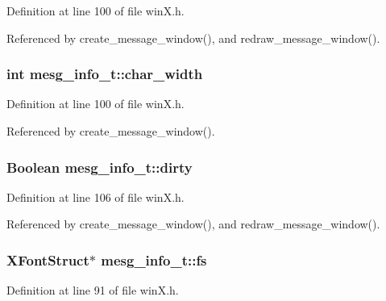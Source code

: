 Definition at line 100 of file win\+X.\+h.



Referenced by create\+\_\+message\+\_\+window(), and redraw\+\_\+message\+\_\+window().

\hypertarget{structmesg__info__t_a9d448d94905365fda9859981ae2d07a1}{
\subsubsection[{char\+\_\+width}]{\setlength{\rightskip}{0pt plus 5cm}int mesg\+\_\+info\+\_\+t\+::char\+\_\+width}}\label{structmesg__info__t_a9d448d94905365fda9859981ae2d07a1}


Definition at line 100 of file win\+X.\+h.



Referenced by create\+\_\+message\+\_\+window().

\hypertarget{structmesg__info__t_a08f16d5343387918e19cb9812303a4c7}{
\subsubsection[{dirty}]{\setlength{\rightskip}{0pt plus 5cm}Boolean mesg\+\_\+info\+\_\+t\+::dirty}}\label{structmesg__info__t_a08f16d5343387918e19cb9812303a4c7}


Definition at line 106 of file win\+X.\+h.



Referenced by create\+\_\+message\+\_\+window(), and redraw\+\_\+message\+\_\+window().

\hypertarget{structmesg__info__t_a3ac4711a90ce72d56e435d5d44167932}{
\subsubsection[{fs}]{\setlength{\rightskip}{0pt plus 5cm}X\+Font\+Struct$\ast$ mesg\+\_\+info\+\_\+t\+::fs}}\label{structmesg__info__t_a3ac4711a90ce72d56e435d5d44167932}


Definition at line 91 of file win\+X.\+h.



